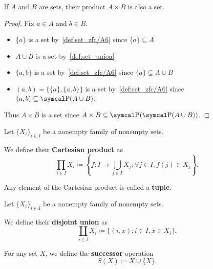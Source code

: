 \begin{proposition}\label{def:binary_cartesian_product_is_set}
  If \( A \) and \( B \) are sets, their product \( A \times B \) is also a set.
\end{proposition}
\begin{proof}
  Fix \( a \in A \) and \( b \in B \).
  \begin{itemize}
    \item \( \{ a \} \) is a set by~\ref{def:set_zfc/A6} since \( \{ a \} \subseteq A \)
    \item \( A \cup B \) is a set by~\cref{def:set_union}
    \item \( \{ a, b \} \) is a set by~\ref{def:set_zfc/A6} since \( \{ a \} \subseteq A \cup B \)
    \item \( (a, b) = \{ \{ a \}, \{ a, b \} \} \) is a set by~\ref{def:set_zfc/A6} since \( (a, b) \subseteq \Power(A \cup B) \).
  \end{itemize}

  Thus \( A \times B \) is a set since \( A \times B \subseteq \Power(\Power(A \cup B)) \).
\end{proof}

\begin{definition}\label{def:cartesian_product}\cite[54]{Enderton1977}
  Let \( \{ X_i \}_{i \in I} \) be a nonempty family of nonempty sets.

  We define their \textbf{Cartesian product} as
  \begin{equation*}
    \prod_{i \in I} X_i \coloneqq \left\{ f: I \to \bigcup_{j \in I} X_j \colon \forall j \in I, f(j) \in X_j \right\}.
  \end{equation*}

  Any element of the Cartesian product is called a \textbf{tuple}.
\end{definition}

\begin{definition}\label{def:disjoint_union}
  Let \( \{ X_i \}_{i \in I} \) be a nonempty family of nonempty sets.

  We define their \textbf{disjoint union} as
  \begin{equation*}
    \coprod_{i \in I} X_i \coloneqq \{ (i, x) \colon i \in I, x \in X_i \}.
  \end{equation*}
\end{definition}

\begin{definition}\label{def:successor_operator}\cite[68]{Enderton1977}
  For any set \( X \), we define the \textbf{successor} operation
  \begin{equation*}
    S(X) \coloneqq X \cup \{ X \}.
  \end{equation*}
\end{definition}

